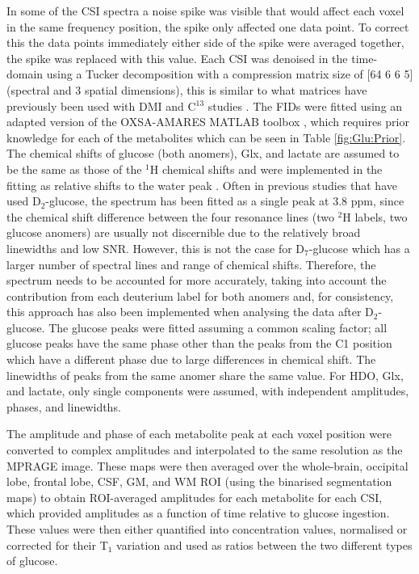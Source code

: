 In some of the \ac{CSI} spectra a noise spike was visible that would affect each voxel in the same frequency position, the spike only affected one data point. To correct this the data points immediately either side of the spike were averaged together, the spike was replaced with this value. Each \ac{CSI} was denoised in the time-domain using a Tucker decomposition \cite{Bader2007EfficientTensors} with a compression matrix size of [64 6 6 5] (spectral and 3 spatial dimensions), this is similar to what  matrices have previously been used with \ac{DMI} \cite{vonMorze2021ComparisonT, Kreis2020MeasuringMRI} and C$^{13}$ studies \cite{Brender2019DynamicHyperpolarization}. The \ac{FID}s were fitted using an adapted version of the OXSA-\ac{AMARES} MATLAB toolbox \cite{Vanhamme1997ImprovedKnowledge, Purvis2017OXSA:MATLAB}, which requires prior knowledge for each of the metabolites which can be seen in Table \ref{fig:Glu:Prior}. The chemical shifts of glucose (both anomers), Glx, and lactate are assumed to be the same as those of the $^1$H chemical shifts \cite{Govindaraju2000ProtonMetabolites} and were implemented in the fitting as relative shifts to the water peak \cite{Meerwaldt2023InImaging}. Often in previous studies that have used D$_2$-glucose, the spectrum has been fitted as a single peak at 3.8 ppm, since the chemical shift difference between the four resonance lines (two $^2$H labels, two glucose anomers) are usually not discernible due to the relatively broad linewidths and low SNR. However, this is not the case for D$_7$-glucose \cite{Govindaraju2000ProtonMetabolites} which has a larger number of spectral lines and range of chemical shifts. Therefore, the spectrum needs to be accounted for more accurately, taking into account the contribution from each deuterium label for both anomers and, for consistency, this approach has also been implemented when analysing the data after D$_2$-glucose. The glucose peaks were fitted assuming a common scaling factor; all glucose peaks have the same phase other than the peaks from the C1 position which have a different phase due to large differences in chemical shift. The linewidths of peaks from the same anomer share the same value. For \ac{HDO}, Glx, and lactate, only single components were assumed, with independent amplitudes, phases, and linewidths.

The amplitude and phase of each metabolite peak at each voxel position were converted to complex amplitudes and interpolated to the same resolution as the \ac{MPRAGE} image. These maps were then averaged over the whole-brain, occipital lobe, frontal lobe, \ac{CSF}, \ac{GM}, and \ac{WM} \ac{ROI} (using the binarised segmentation maps) to obtain \ac{ROI}-averaged amplitudes for each metabolite for each \ac{CSI}, which provided amplitudes as a function of time relative to glucose ingestion. These values were then either quantified into concentration values, normalised or corrected for their T$_1$ variation and used as ratios between the two different types of glucose.

